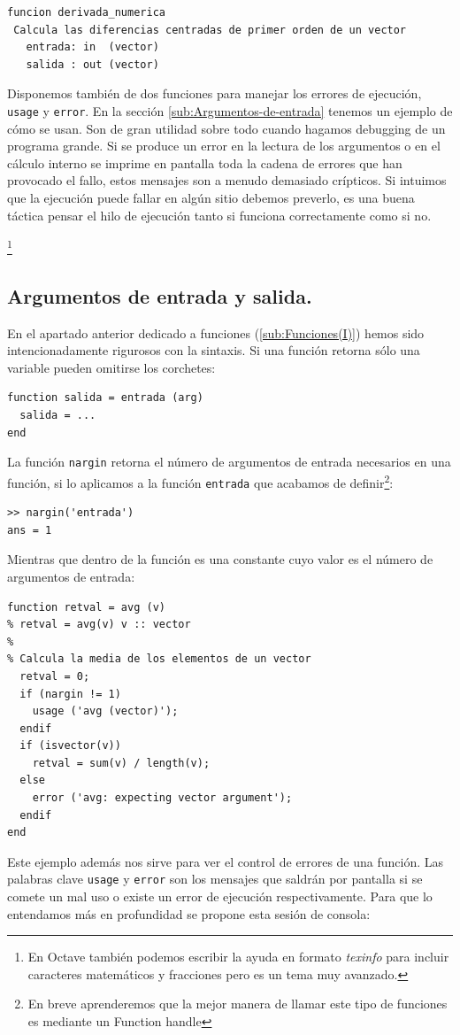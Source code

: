 \begin{lstlisting}
funcion derivada_numerica   
 Calcula las diferencias centradas de primer orden de un vector   
   entrada: in  (vector)   
   salida : out (vector)
\end{lstlisting}

Disponemos también de dos funciones para manejar los errores de
ejecución, \texttt{usage} y \texttt{error}. En la sección
\ref{sub:Argumentos-de-entrada} tenemos un ejemplo de cómo se usan.
Son de gran utilidad sobre todo cuando hagamos debugging de un
programa grande. Si se produce un error en la lectura de los
argumentos o en el cálculo interno se imprime en pantalla toda la
cadena de errores que han provocado el fallo, estos mensajes son a
menudo demasiado crípticos. Si intuimos que la ejecución puede fallar
en algún sitio debemos preverlo, es una buena táctica pensar el hilo
de ejecución tanto si funciona correctamente como si no.

%
\footnote{En Octave también podemos escribir la ayuda en formato
  \emph{texinfo} para incluir caracteres matemáticos y fracciones pero
  es un tema muy avanzado.%
}


\subsection{Argumentos de entrada y
  salida.\label{sub:Argumentos-de-entrada}}

En el apartado anterior dedicado a funciones (\ref{sub:Funciones(I)})
hemos sido intencionadamente rigurosos con la sintaxis. Si una función
retorna sólo una variable pueden omitirse los corchetes:

\begin{lstlisting}
function salida = entrada (arg)
  salida = ...
end
\end{lstlisting}
La función \texttt{nargin} retorna el número de
argumentos de entrada necesarios en una función, si lo aplicamos a la
función \texttt{entrada} que acabamos de definir\footnote{En breve
  aprenderemos que la mejor manera de llamar este tipo de funciones es
  mediante un Function handle}:

\begin{lstlisting}
>> nargin('entrada')
ans = 1
\end{lstlisting}
Mientras que dentro de la función es una constante cuyo valor es el
número de argumentos de entrada:

\begin{lstlisting}
function retval = avg (v)
% retval = avg(v) v :: vector
%
% Calcula la media de los elementos de un vector
  retval = 0;
  if (nargin != 1)
    usage ('avg (vector)');
  endif
  if (isvector(v))
    retval = sum(v) / length(v);
  else
    error ('avg: expecting vector argument');
  endif
end
\end{lstlisting}
Este ejemplo además nos sirve para ver el control de errores de una
función. Las palabras clave \texttt{usage} y
\texttt{error} son los mensajes que saldrán por pantalla
si se comete un mal uso o existe un error de ejecución
respectivamente. Para que lo entendamos más en profundidad se propone
esta sesión de consola:

